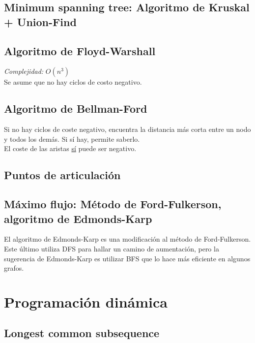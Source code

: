 \documentclass[10pt,letterpaper]{article}
\begin{document}

\subsection{Minimum spanning tree: Algoritmo de Kruskal + Union-Find}

\subsection{Algoritmo de Floyd-Warshall}
\emph{Complejidad:} $ O(n^3) $ \\
Se asume que no hay ciclos de costo negativo.

\subsection{Algoritmo de Bellman-Ford}
Si no hay ciclos de coste negativo, encuentra la distancia más corta entre un nodo
y todos los demás. Si sí hay, permite saberlo. \\
El coste de las aristas \underline{sí} puede ser negativo.

\subsection{Puntos de articulación}

\subsection{Máximo flujo: Método de Ford-Fulkerson, algoritmo de Edmonds-Karp}
El algoritmo de Edmonds-Karp es una modificación al método de Ford-Fulkerson. Este último
utiliza DFS para hallar un camino de aumentación, pero la sugerencia de Edmonds-Karp
es utilizar BFS que lo hace más eficiente en algunos grafos.
\medskip


\section{Programación dinámica}
\subsection{Longest common subsequence}
\end{document}
